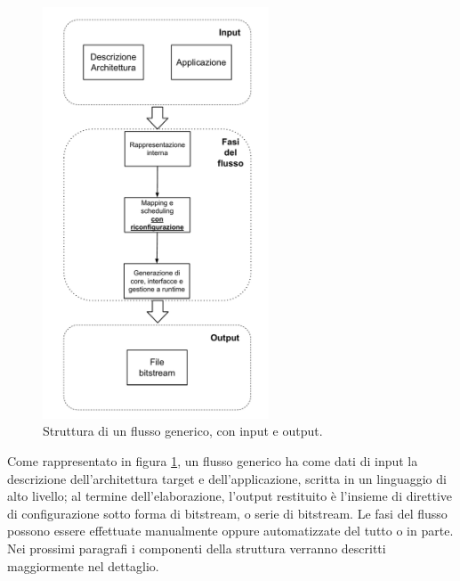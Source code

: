 \begin{figure}[tbh]
  \begin{center}
    \includegraphics[width=0.6\textwidth]{./capitoli/figure/cap1/StrutturaFlusso.pdf}
    \caption{Struttura di un flusso generico, con input e output.}
    \label{fig:strutturaFlusso}
  \end{center}
\end{figure}

Come rappresentato in figura \ref{fig:strutturaFlusso}, un flusso generico ha come dati di input la descrizione
dell'architettura target e dell'applicazione, scritta in un linguaggio di alto livello;
al termine dell'elaborazione, l'output restituito \`e l'insieme di direttive di configurazione sotto forma
di bitstream, o serie di bitstream. Le fasi del flusso possono essere effettuate manualmente
oppure automatizzate del tutto o in parte. Nei prossimi paragrafi i componenti della struttura verranno descritti
maggiormente nel dettaglio.

